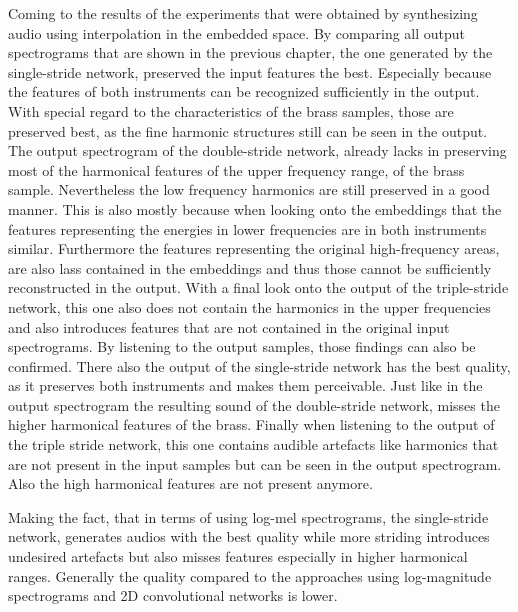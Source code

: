 Coming to the results of the experiments that were obtained by synthesizing audio using interpolation in the embedded space. By comparing all output spectrograms that are shown in the previous chapter, the one generated by the single-stride network, preserved the input features the best. Especially because the features of both instruments can be recognized sufficiently in the output. With special regard to the characteristics of the brass samples, those are preserved best, as the fine harmonic structures still can be seen in the output. The output spectrogram of the double-stride network, already lacks in preserving most of the harmonical features of the upper frequency range, of the brass sample. Nevertheless the low frequency harmonics are still preserved in a good manner. This is also mostly because when looking onto the embeddings that the features representing the energies in lower frequencies are in both instruments similar. Furthermore the features representing the original high-frequency areas, are also lass contained in the embeddings and thus those cannot be sufficiently reconstructed in the output. With a final look onto the output of the triple-stride network, this one also does not contain the harmonics in the upper frequencies and also introduces features that are not contained in the original input spectrograms. By listening to the output samples, those findings can also be confirmed. There also the output of the single-stride network has the best quality, as it preserves both instruments and makes them perceivable. Just like in the output spectrogram the resulting sound of the double-stride network, misses the higher harmonical features of the brass. Finally when listening to the output of the triple stride network, this one contains audible artefacts like harmonics that are not present in the input samples but can be seen in the output spectrogram. Also the high harmonical features are not present anymore.

Making the fact, that in terms of using log-mel spectrograms, the single-stride network, generates audios with the best quality while more striding introduces undesired artefacts but also misses features especially in higher harmonical ranges. Generally the quality compared to the approaches using log-magnitude spectrograms and 2D convolutional networks is lower. 

